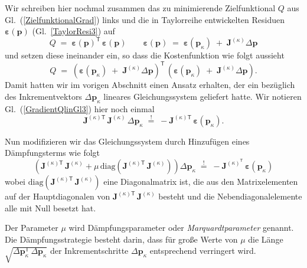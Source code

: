 Wir schreiben hier nochmal zusammen das zu minimierende Zielfunktional $Q$ aus Gl.~(\ref{ZielfunktionalGrad}) links
und die in Taylorreihe entwickelten Residuen $\boldsymbol{\varepsilon}(\mathbf{p})$
(Gl.~\ref{TaylorResi3}) auf
$$
Q \; = \; \boldsymbol{\varepsilon}(\mathbf{p})^\mathsf{T} \, \boldsymbol{\varepsilon}(\mathbf{p})
\qquad
\boldsymbol{\varepsilon}(\mathbf{p})
\; = \;
\boldsymbol{\varepsilon}(\mathbf{p}_\kappa)
\; + \; \boldsymbol{J}^{(\kappa)} \Delta \mathbf{p}
$$
und setzen diese ineinander ein, so dass die Kostenfunktion wie folgt aussieht
\begin{equation}
Q \; = \; \left( \boldsymbol{\varepsilon}(\mathbf{p}_\kappa)
\; + \; \boldsymbol{J}^{(\kappa)} \Delta \mathbf{p} \right)^\mathsf{T} \,
\left( \boldsymbol{\varepsilon}(\mathbf{p}_\kappa)
\; + \; \boldsymbol{J}^{(\kappa)} \Delta \mathbf{p} \right) .
\label{ZielfunktionalTaylorResi}
\end{equation}
Damit hatten wir im vorigen Abschnitt einen Ansatz erhalten, der
ein bezüglich des Inkrementvektors $\Delta \mathbf{p}_\kappa$ lineares Gleichungssystem
geliefert hatte. Wir notieren Gl.~(\ref{GradientQlinGl3}) hier noch einmal
\begin{equation*}
 \boldsymbol{J}^{(\kappa) \textsf{T}} \, \boldsymbol{J}^{(\kappa)} \, \Delta \mathbf{p}_\kappa
\; \overset{!}{=} \;
-  \boldsymbol{J}^{(\kappa) \textsf{T}} \, \boldsymbol{\varepsilon}(\mathbf{p}_\kappa) .
\end{equation*}

Nun modifizieren wir das Gleichungssystem durch Hinzufügen eines Dämpfungsterms
wie folgt
\begin{equation}
\left(
\boldsymbol{J}^{(\kappa) \textsf{T}} \, \boldsymbol{J}^{(\kappa)}
 + \mu \, \mathrm{diag}\left(\boldsymbol{J}^{(\kappa) \textsf{T}} \, \boldsymbol{J}^{(\kappa)}\right)
 \right) \Delta \mathbf{p}_\kappa \;
\overset{!}{=} \; - \boldsymbol{J}^{(\kappa)^\textsf{T}} \, \boldsymbol{\varepsilon}(\mathbf{p}_\kappa)
\label{ZielfunktionalGradTaylorResiDaempf}
\end{equation}
wobei $\mathrm{diag}\left(\boldsymbol{J}^{(\kappa) \textsf{T}} \, \boldsymbol{J}^{(\kappa)}\right)$
eine Diagonalmatrix ist, die aus den Matrixelementen auf der Hauptdiagonalen von
$\boldsymbol{J}^{(\kappa) \textsf{T}} \, \boldsymbol{J}^{(\kappa)}$ besteht und die
Nebendiagonalelemente alle mit Null besetzt hat.

Der Parameter $\mu$ wird Dämpfungsparameter oder \textsl{Marquardtparameter} genannt.
Die Dämpf\-ungs\-strategie besteht darin, dass für große Werte von $\mu$ die Länge
$\sqrt{\Delta \mathbf{p}_\kappa^\mathsf{T} \, \Delta \mathbf{p}_\kappa}$
der Inkrementschritte $\Delta \mathbf{p}_\kappa$ entsprechend verringert wird.

